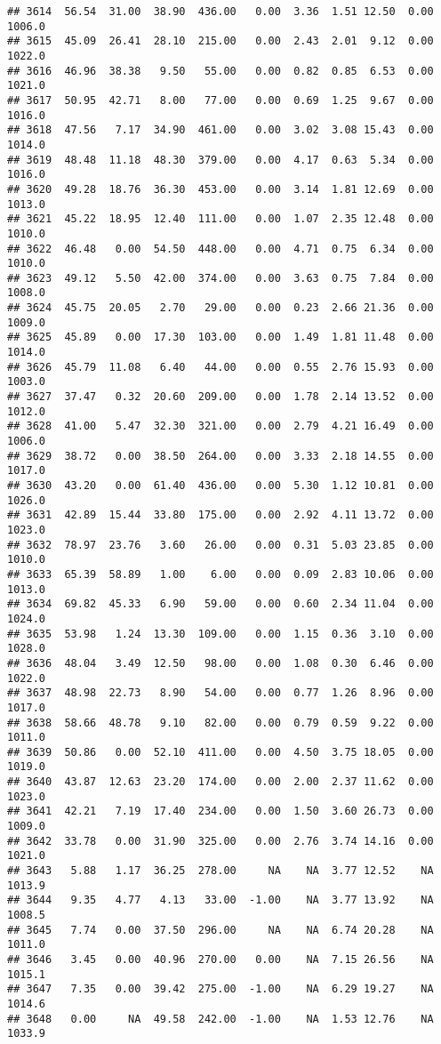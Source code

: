 \documentclass{article}\usepackage{graphicx, color}
\makeatletter
\newenvironment{kframe}{%
 \def\at@end@of@kframe{}%
 \ifinner\ifhmode%
  \def\at@end@of@kframe{\end{minipage}}%
  \begin{minipage}{\columnwidth}%
 \fi\fi%
 \def\FrameCommand##1{\hskip\@totalleftmargin \hskip-\fboxsep
 \colorbox{shadecolor}{##1}\hskip-\fboxsep
     \hskip-\linewidth \hskip-\@totalleftmargin \hskip\columnwidth}%
 \MakeFramed {\advance\hsize-\width
   \@totalleftmargin\z@ \linewidth\hsize
   \@setminipage}}%
 {\par\unskip\endMakeFramed%
 \at@end@of@kframe}
\newenvironment{knitrout}{}{} %
\makeatother
\begin{document}
\begin{knitrout}
\begin{kframe}
\begin{verbatim}
## 3614  56.54  31.00  38.90  436.00   0.00  3.36  1.51 12.50  0.00 1006.0
## 3615  45.09  26.41  28.10  215.00   0.00  2.43  2.01  9.12  0.00 1022.0
## 3616  46.96  38.38   9.50   55.00   0.00  0.82  0.85  6.53  0.00 1021.0
## 3617  50.95  42.71   8.00   77.00   0.00  0.69  1.25  9.67  0.00 1016.0
## 3618  47.56   7.17  34.90  461.00   0.00  3.02  3.08 15.43  0.00 1014.0
## 3619  48.48  11.18  48.30  379.00   0.00  4.17  0.63  5.34  0.00 1016.0
## 3620  49.28  18.76  36.30  453.00   0.00  3.14  1.81 12.69  0.00 1013.0
## 3621  45.22  18.95  12.40  111.00   0.00  1.07  2.35 12.48  0.00 1010.0
## 3622  46.48   0.00  54.50  448.00   0.00  4.71  0.75  6.34  0.00 1010.0
## 3623  49.12   5.50  42.00  374.00   0.00  3.63  0.75  7.84  0.00 1008.0
## 3624  45.75  20.05   2.70   29.00   0.00  0.23  2.66 21.36  0.00 1009.0
## 3625  45.89   0.00  17.30  103.00   0.00  1.49  1.81 11.48  0.00 1014.0
## 3626  45.79  11.08   6.40   44.00   0.00  0.55  2.76 15.93  0.00 1003.0
## 3627  37.47   0.32  20.60  209.00   0.00  1.78  2.14 13.52  0.00 1012.0
## 3628  41.00   5.47  32.30  321.00   0.00  2.79  4.21 16.49  0.00 1006.0
## 3629  38.72   0.00  38.50  264.00   0.00  3.33  2.18 14.55  0.00 1017.0
## 3630  43.20   0.00  61.40  436.00   0.00  5.30  1.12 10.81  0.00 1026.0
## 3631  42.89  15.44  33.80  175.00   0.00  2.92  4.11 13.72  0.00 1023.0
## 3632  78.97  23.76   3.60   26.00   0.00  0.31  5.03 23.85  0.00 1010.0
## 3633  65.39  58.89   1.00    6.00   0.00  0.09  2.83 10.06  0.00 1013.0
## 3634  69.82  45.33   6.90   59.00   0.00  0.60  2.34 11.04  0.00 1024.0
## 3635  53.98   1.24  13.30  109.00   0.00  1.15  0.36  3.10  0.00 1028.0
## 3636  48.04   3.49  12.50   98.00   0.00  1.08  0.30  6.46  0.00 1022.0
## 3637  48.98  22.73   8.90   54.00   0.00  0.77  1.26  8.96  0.00 1017.0
## 3638  58.66  48.78   9.10   82.00   0.00  0.79  0.59  9.22  0.00 1011.0
## 3639  50.86   0.00  52.10  411.00   0.00  4.50  3.75 18.05  0.00 1019.0
## 3640  43.87  12.63  23.20  174.00   0.00  2.00  2.37 11.62  0.00 1023.0
## 3641  42.21   7.19  17.40  234.00   0.00  1.50  3.60 26.73  0.00 1009.0
## 3642  33.78   0.00  31.90  325.00   0.00  2.76  3.74 14.16  0.00 1021.0
## 3643   5.88   1.17  36.25  278.00     NA    NA  3.77 12.52    NA 1013.9
## 3644   9.35   4.77   4.13   33.00  -1.00    NA  3.77 13.92    NA 1008.5
## 3645   7.74   0.00  37.50  296.00     NA    NA  6.74 20.28    NA 1011.0
## 3646   3.45   0.00  40.96  270.00   0.00    NA  7.15 26.56    NA 1015.1
## 3647   7.35   0.00  39.42  275.00  -1.00    NA  6.29 19.27    NA 1014.6
## 3648   0.00     NA  49.58  242.00  -1.00    NA  1.53 12.76    NA 1033.9

\end{verbatim}
\end{kframe}
\end{knitrout}
\end{document}
